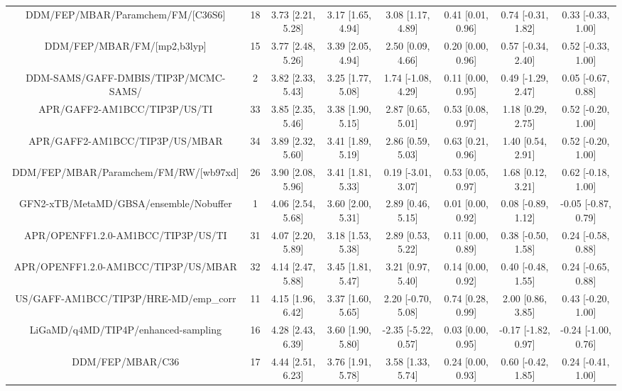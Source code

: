 \documentclass[8pt]{article}
\begin{document}
\begin{center}
\begin{footnotesize}
\begin{longtable}{|cccccccc|}
        DDM/FEP/MBAR/Paramchem/FM/[C36S6] &  18 &   3.73 [2.21, 5.28] &   3.17 [1.65, 4.94] &     3.08 [1.17, 4.89] &  0.41 [0.01, 0.96] &   0.74 [-0.31, 1.82] &   0.33 [-0.33, 1.00] \\
              DDM/FEP/MBAR/FM/[mp2,b3lyp] &  15 &   3.77 [2.48, 5.26] &   3.39 [2.05, 4.94] &     2.50 [0.09, 4.66] &  0.20 [0.00, 0.96] &   0.57 [-0.34, 2.40] &   0.52 [-0.33, 1.00] \\
     DDM-SAMS/GAFF-DMBIS/TIP3P/MCMC-SAMS/ &   2 &   3.82 [2.33, 5.43] &   3.25 [1.77, 5.08] &    1.74 [-1.08, 4.29] &  0.11 [0.00, 0.95] &   0.49 [-1.29, 2.47] &   0.05 [-0.67, 0.88] \\
             APR/GAFF2-AM1BCC/TIP3P/US/TI &  33 &   3.85 [2.35, 5.46] &   3.38 [1.90, 5.15] &     2.87 [0.65, 5.01] &  0.53 [0.08, 0.97] &    1.18 [0.29, 2.75] &   0.52 [-0.20, 1.00] \\
           APR/GAFF2-AM1BCC/TIP3P/US/MBAR &  34 &   3.89 [2.32, 5.60] &   3.41 [1.89, 5.19] &     2.86 [0.59, 5.03] &  0.63 [0.21, 0.96] &    1.40 [0.54, 2.91] &   0.52 [-0.20, 1.00] \\
    DDM/FEP/MBAR/Paramchem/FM/RW/[wb97xd] &  26 &   3.90 [2.08, 5.96] &   3.41 [1.81, 5.33] &    0.19 [-3.01, 3.07] &  0.53 [0.05, 0.97] &    1.68 [0.12, 3.21] &   0.62 [-0.18, 1.00] \\
   GFN2-xTB/MetaMD/GBSA/ensemble/Nobuffer &   1 &   4.06 [2.54, 5.68] &   3.60 [2.00, 5.31] &     2.89 [0.46, 5.15] &  0.01 [0.00, 0.92] &   0.08 [-0.89, 1.12] &  -0.05 [-0.87, 0.79] \\
       APR/OPENFF1.2.0-AM1BCC/TIP3P/US/TI &  31 &   4.07 [2.20, 5.89] &   3.18 [1.53, 5.38] &     2.89 [0.53, 5.22] &  0.11 [0.00, 0.89] &   0.38 [-0.50, 1.58] &   0.24 [-0.58, 0.88] \\
     APR/OPENFF1.2.0-AM1BCC/TIP3P/US/MBAR &  32 &   4.14 [2.47, 5.88] &   3.45 [1.81, 5.47] &     3.21 [0.97, 5.40] &  0.14 [0.00, 0.92] &   0.40 [-0.48, 1.55] &   0.24 [-0.65, 0.88] \\
    US/GAFF-AM1BCC/TIP3P/HRE-MD/emp\_corr &  11 &   4.15 [1.96, 6.42] &   3.37 [1.60, 5.65] &    2.20 [-0.70, 5.08] &  0.74 [0.28, 0.99] &    2.00 [0.86, 3.85] &   0.43 [-0.20, 1.00] \\
      LiGaMD/q4MD/TIP4P/enhanced-sampling &  16 &   4.28 [2.43, 6.39] &   3.60 [1.90, 5.80] &   -2.35 [-5.22, 0.57] &  0.03 [0.00, 0.95] &  -0.17 [-1.82, 0.97] &  -0.24 [-1.00, 0.76] \\
                         DDM/FEP/MBAR/C36 &  17 &   4.44 [2.51, 6.23] &   3.76 [1.91, 5.78] &     3.58 [1.33, 5.74] &  0.24 [0.00, 0.93] &   0.60 [-0.42, 1.85] &   0.24 [-0.41, 1.00] \\

\end{longtable}
\end{footnotesize}
\end{center}
\end{document}
